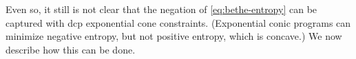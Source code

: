 \documentclass[twoside]{article}
\begin{document}
Even so,
it still is not clear that the negation of \eqref{eq:bethe-entropy} can be
captured with dcp exponential cone constraints.
(Exponential conic programs can minimize negative entropy,
 but not positive entropy, which is concave.)
We now describe how this can be done.

\def\Par{\mathrm{Par}}
\def\Pash{\mathit{V\mskip-5muC\mskip-3.5muP\!}}
\end{document}
